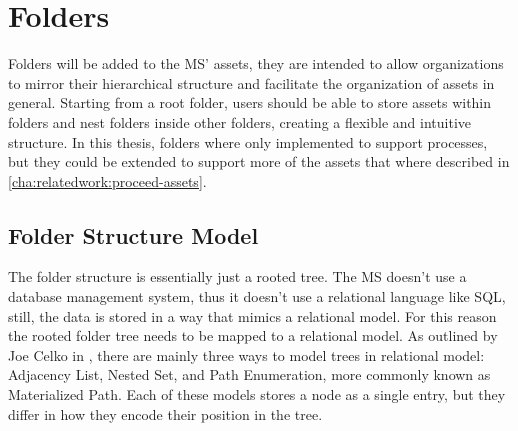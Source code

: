 %

\section{Folders}
\label{cha:conceptanddesign:folders}

Folders will be added to the MS' assets,
they are intended to allow organizations to mirror their hierarchical structure and
facilitate the organization of assets in general.
Starting from a root folder, users should be able to store assets within folders and nest
folders inside other folders, creating a flexible and intuitive structure.
In this thesis, folders where only implemented to support processes, but they could be extended to
support more of the assets that where described in \ref{cha:relatedwork:proceed-assets}.

\subsection{Folder Structure Model}


The folder structure is essentially just a rooted tree.
The MS doesn't use a database management system, thus it doesn't use a relational
language like SQL, still, the data is stored in a way that mimics a relational model.
For this reason the rooted folder tree needs to be mapped to a relational model.
%
As outlined by Joe Celko in \cite{celkoSQLTrees}, there are mainly three ways to model
trees in relational model:
Adjacency List, Nested Set, and  Path Enumeration, more commonly known as Materialized Path.
Each of these models stores a node as a single entry, but they differ in how they encode
their position in the tree.

